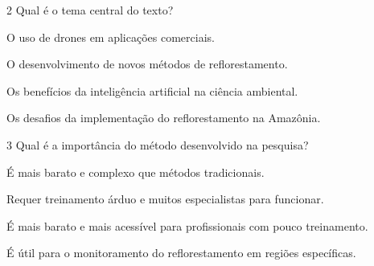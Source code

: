 \num{2} Qual é o tema central do texto?

\begin{escolha}
\item O uso de drones em aplicações comerciais.
\item O desenvolvimento de novos métodos de reflorestamento.
\item Os benefícios da inteligência artificial na ciência ambiental.
\item Os desafios da implementação do reflorestamento na Amazônia.
\end{escolha}



\num{3} Qual é a importância do método desenvolvido na pesquisa?

\begin{escolha}
\item É mais barato e complexo que métodos tradicionais.
\item Requer treinamento árduo e muitos especialistas para funcionar.
\item É mais barato e mais acessível para profissionais com pouco
treinamento.
\item É útil para o monitoramento do reflorestamento em regiões
específicas.
\end{escolha}


